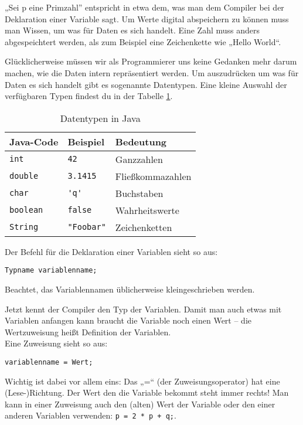 „Sei p eine Primzahl” entspricht in etwa dem, was man dem Compiler bei der Deklaration einer Variable sagt. Um Werte digital abspeichern zu können muss man Wissen, um was für Daten es sich handelt. Eine Zahl muss anders abgespeichtert werden, als zum Beispiel eine Zeichenkette wie „Hello World“.

Glücklicherweise müssen wir als Programmierer uns keine Gedanken mehr darum machen, wie die Daten intern repräsentiert werden.
Um auszudrücken um was für Daten es sich handelt gibt es sogenannte Datentypen. Eine kleine Auswahl der verfügbaren Typen findest du in der Tabelle \ref{Datentypen}. \\

\begin{table}
\centering
\begin{tabular}{l|l|l}
Java-Code & Beispiel & Bedeutung \\ \hline
\lstinline$int$ & \lstinline$42$ & Ganzzahlen \\
\lstinline$double$ & \lstinline$3.1415$ & Fließkommazahlen \\
\lstinline$char$ & \lstinline$'q'$ & Buchstaben \\
\lstinline$boolean$ & \lstinline$false$ & Wahrheitswerte \\
\lstinline$String$ & \lstinline$"Foobar"$ & Zeichenketten \\

\end{tabular}
\caption{Datentypen in Java}
\label{Datentypen}
\end{table}

Der Befehl für die Deklaration einer Variablen sieht so aus: 
\begin{lstlisting}
Typname variablenname;
\end{lstlisting}
Beachtet, das Variablennamen üblicherweise kleingeschrieben werden.

Jetzt kennt der Compiler den Typ der Variablen. 
Damit man auch etwas mit Variablen anfangen kann braucht die Variable noch einen Wert – die Wertzuweisung heißt Definition der Variablen. \\
Eine Zuweisung sieht so aus: 
\begin{lstlisting}
variablenname = Wert;
\end{lstlisting}
Wichtig ist dabei vor allem eins: Das „=“ (der Zuweisungsoperator) hat eine (Lese-)Richtung. Der Wert den die Variable bekommt steht immer rechts!
Man kann in einer Zuweisung auch den (alten) Wert der Variable oder den einer anderen Variablen verwenden: \lstinline$p = 2 * p + q;$.

